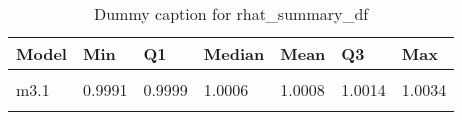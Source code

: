 \begin{table}
\centering
\caption{Dummy caption for rhat_summary_df}
\centering
\fontsize{10}{12}\selectfont
\begin{tabular}[t]{lllllll}
\toprule
Model & Min & Q1 & Median & Mean & Q3 & Max\\
\midrule
\cellcolor{gray!10}{m2} & \cellcolor{gray!10}{0.9992} & \cellcolor{gray!10}{0.9997} & \cellcolor{gray!10}{1.0004} & \cellcolor{gray!10}{1.0009} & \cellcolor{gray!10}{1.0016} & \cellcolor{gray!10}{1.0052}\\
m3.1 & 0.9991 & 0.9999 & 1.0006 & 1.0008 & 1.0014 & 1.0034\\
\cellcolor{gray!10}{m4} & \cellcolor{gray!10}{0.9994} & \cellcolor{gray!10}{1.0000} & \cellcolor{gray!10}{1.0006} & \cellcolor{gray!10}{1.0009} & \cellcolor{gray!10}{1.0017} & \cellcolor{gray!10}{1.0047}\\
\bottomrule
\end{tabular}
\end{table}
